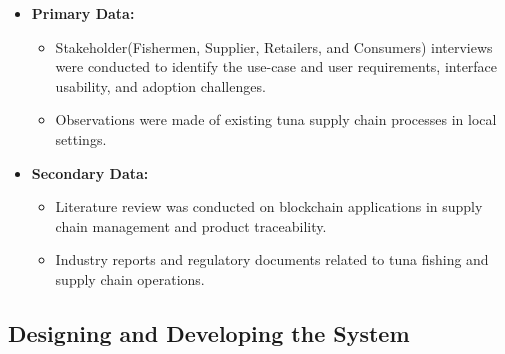 \begin{itemize}
	\item \textbf{Primary Data:} 
	\begin{itemize}
		\item Stakeholder(Fishermen, Supplier, Retailers, and Consumers) interviews were conducted to identify the use-case and user requirements, interface usability, and adoption challenges.
		\item Observations were made of existing tuna supply chain processes in local settings.
	\end{itemize}
	\item \textbf{Secondary Data:} 
	\begin{itemize}
		\item Literature review was conducted on blockchain applications in supply chain management and product traceability.
		\item Industry reports and regulatory documents related to tuna fishing and supply chain operations.
	\end{itemize}
\end{itemize}

\subsection{Designing and Developing the System}

